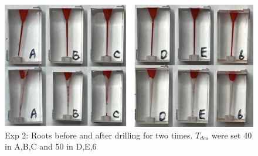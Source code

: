 \begin{figure}[htbp]
\begin{center}
\includegraphics[width=1\linewidth]{Images/exp/roots.png}
\caption{Exp 2: Roots before and after drilling for two times. $T_{des}$ were set 40 in A,B,C and 50 in D,E,6}
\label{fig: exp2_roots}
\end{center}
\end{figure}	

